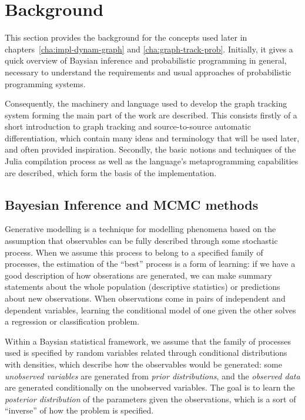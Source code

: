 \chapter{Background}
\label{cha:background}

This section provides the background for the concepts used later in
chapters~\ref{cha:impl-dynam-graph} and \ref{cha:graph-track-prob}.  Initially, it gives a quick
overview of Baysian inference and probabilistic programming in general, necessary to understand the
requirements and usual approaches of probabilistic programming systems.

Consequently, the machinery and language used to develop the graph tracking system forming the main
part of the work are described.  This consists firstly of a short introduction to graph tracking and
source-to-source automatic differentiation, which contain many ideas and terminology that will be
used later, and often provided inspiration.  Secondly, the basic notions and techniques of the Julia
compilation process as well as the language's metaprogramming capabilities are described, which form
the basis of the implementation.


\section{Bayesian Inference and MCMC methods}
\label{sec:bayes-infer}

Generative modelling is a technique for modelling phenomena based on the assumption that
observables can be fully described through some stochastic process.  When we assume this process to
belong to a specified family of processes, the estimation of the \enquote{best} process is a form of
learning: if we have a good description of how obserations are generated, we can make summary
statements about the whole population (descriptive statistics) or predictions about new
observations.  When observations come in pairs of independent and dependent variables, learning the
conditional model of one given the other solves a regression or classification problem.

Within a Baysian statistical framework, we assume that the family of processes used is specified by
random variables related through conditional distributions with densities, which describe how the
observables would be generated: some \emph{unobserved variables} are generated from \emph{prior
  distributions}, and the \emph{observed data} are generated conditionally on the unobserved
variables.  The goal is to learn the \emph{posterior distribution} of the parameters given the
observations, which is a sort of \enquote{inverse} of how the problem is specified.

